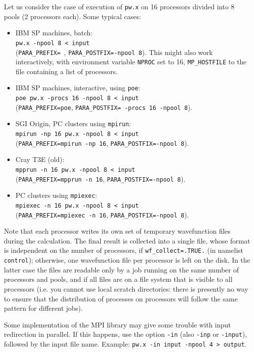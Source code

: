 \documentclass[12pt]{article}
\begin{document}
Let us consider the case of execution of {\tt pw.x} on 16 processors 
divided into 8 pools (2 processors each). Some typical cases:
\begin{itemize}
\item IBM SP machines, batch: \\
{\tt pw.x -npool 8 < input} \\
({\tt PARA\_PREFIX= }, {\tt PARA\_POSTFIX=-npool 8}). 
This might also work interactively, with environment variable 
{\tt NPROC} set to 16, {\tt MP\_HOSTFILE} to the file containing
a list of processors.
\item IBM SP machines, interactive, using {\tt poe}: \\
{\tt poe pw.x -procs 16 -npool 8 < input} \\
({\tt PARA\_PREFIX=poe}, {\tt PARA\_POSTFIX= -procs 16 -npool 8}).
\item SGI Origin, PC clusters using {\tt mpirun}: \\
{\tt mpirun -np 16 pw.x -npool 8 < input} \\
({\tt PARA\_PREFIX=mpirun -np 16}, {\tt PARA\_POSTFIX=-npool 8}).
\item Cray T3E (old): \\
{\tt mpprun -n 16 pw.x -npool 8 < input} \\
({\tt PARA\_PREFIX=mpprun -n 16}, {\tt PARA\_POSTFIX=-npool 8}).
\item PC clusters using  {\tt mpiexec}: \\
{\tt mpiexec -n 16 pw.x -npool 8 < input} \\
({\tt PARA\_PREFIX=mpiexec -n 16}, {\tt PARA\_POSTFIX=-npool 8}).
\end{itemize}
Note that each processor writes its own set of temporary wavefunction
files during the calculation.  The final result is collected into a 
single file, whose format is independent on the number of processors, 
if {\tt wf\_collect=.TRUE.} (in namelist {\tt control}); otherwise, 
one wavefunction file per processor is left on the disk. In the latter 
case the files are readable only by a job running on the same number 
of processors and pools, and if all files are on a file system that
is visible to all processors (i.e. you cannot use local scratch
directories: there is presently no way to ensure that the distribution
of processes on processors will follow the same pattern for different
jobs).

Some implementation of the MPI library may give some trouble with
input redirection in parallel. If this happens, use the option
{\tt -in} (also {\tt -inp} or {\tt -input}), followed by the input
file name. Example: {\tt pw.x -in input -npool 4 > output}.
\end{document}
